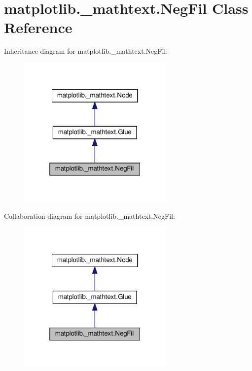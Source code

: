 \hypertarget{classmatplotlib_1_1__mathtext_1_1NegFil}{}\section{matplotlib.\+\_\+mathtext.\+Neg\+Fil Class Reference}
\label{classmatplotlib_1_1__mathtext_1_1NegFil}


Inheritance diagram for matplotlib.\+\_\+mathtext.\+Neg\+Fil\+:
\nopagebreak
\begin{figure}[H]
\begin{center}
\leavevmode
\includegraphics[width=217pt]{classmatplotlib_1_1__mathtext_1_1NegFil__inherit__graph}
\end{center}
\end{figure}


Collaboration diagram for matplotlib.\+\_\+mathtext.\+Neg\+Fil\+:
\nopagebreak
\begin{figure}[H]
\begin{center}
\leavevmode
\includegraphics[width=217pt]{classmatplotlib_1_1__mathtext_1_1NegFil__coll__graph}
\end{center}
\end{figure}
